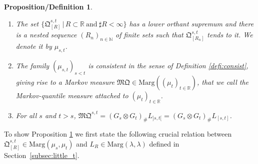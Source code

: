 \documentclass[10pt,a4paper]{article}
\providecommand{\skpt}{\smallskip}
\theoremstyle{plain}
\newtheorem{prodefinition}[them]{Proposition/Definition}
\theoremstyle{definition}
\newcommand{\como}{\mathfrak{Q}}
\newcommand{\mq}{\mathfrak{MQ}}
\newcommand{\la}{\lambda}
\newcommand{\ma}{\mathrm{Marg}}
\newcommand{\R}{\mathbb{R}}
\newcommand{\N}{\mathbb{N}}
\begin{document}
\skpt
\begin{prodefinition}\label{pro:comp_conv}
\begin{enumerate}
\item
\label{aaa} The set $\{\como^{s,t}_{[R]}\,|\,R\subset \R\ \text{and}\ \sharp R<\infty\}$ has a lower orthant supremum and there is a nested sequence $(R_n)_{n\in \N}$ of finite sets such that $\como^{s,t}_{[R_n]}$ tends to it. We denote it by $\mu_{s,t}$.

\item
\label{bbb} The family $(\mu_{s,t})_{s<t}$ is consistent in the sense of Definition \ref{defi:consist}, giving rise to a Markov measure $\mq\in\ma((\mu_t)_{t\in\R})$, that we call the \emph{Markov-quantile measure} attached to $(\mu_t)_{t\in\R}$.

\item
\label{ccc} For all $s$ and $t>s$, $\mq^{s,t}=(G_s\otimes G_t)_\#L_{]s,t[}=(G_s\otimes G_t)_\#L_{[s,t]}$.
\end{enumerate}
\end{prodefinition}

To show Proposition \ref{pro:comp_conv} we first state the following crucial relation between $\como^{s,t}_{[R]}\in \ma(\mu_s,\mu_t)$ and $L_R\in \ma(\la,\la)$ defined in Section~\ref{subsec:little_t}.
\end{document}
